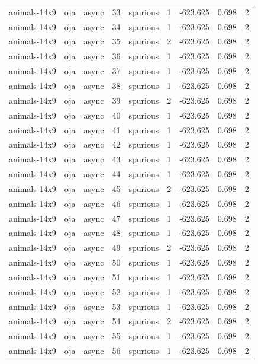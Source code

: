 \begin{tabular}{lllrlrrrr}
animals-14x9 & oja & async & 33 & spurious & 1 & -623.625 & 0.698 & 2 \\
animals-14x9 & oja & async & 34 & spurious & 1 & -623.625 & 0.698 & 2 \\
animals-14x9 & oja & async & 35 & spurious & 2 & -623.625 & 0.698 & 2 \\
animals-14x9 & oja & async & 36 & spurious & 1 & -623.625 & 0.698 & 2 \\
animals-14x9 & oja & async & 37 & spurious & 1 & -623.625 & 0.698 & 2 \\
animals-14x9 & oja & async & 38 & spurious & 1 & -623.625 & 0.698 & 2 \\
animals-14x9 & oja & async & 39 & spurious & 2 & -623.625 & 0.698 & 2 \\
animals-14x9 & oja & async & 40 & spurious & 1 & -623.625 & 0.698 & 2 \\
animals-14x9 & oja & async & 41 & spurious & 1 & -623.625 & 0.698 & 2 \\
animals-14x9 & oja & async & 42 & spurious & 1 & -623.625 & 0.698 & 2 \\
animals-14x9 & oja & async & 43 & spurious & 1 & -623.625 & 0.698 & 2 \\
animals-14x9 & oja & async & 44 & spurious & 1 & -623.625 & 0.698 & 2 \\
animals-14x9 & oja & async & 45 & spurious & 2 & -623.625 & 0.698 & 2 \\
animals-14x9 & oja & async & 46 & spurious & 1 & -623.625 & 0.698 & 2 \\
animals-14x9 & oja & async & 47 & spurious & 1 & -623.625 & 0.698 & 2 \\
animals-14x9 & oja & async & 48 & spurious & 1 & -623.625 & 0.698 & 2 \\
animals-14x9 & oja & async & 49 & spurious & 2 & -623.625 & 0.698 & 2 \\
animals-14x9 & oja & async & 50 & spurious & 1 & -623.625 & 0.698 & 2 \\
animals-14x9 & oja & async & 51 & spurious & 1 & -623.625 & 0.698 & 2 \\
animals-14x9 & oja & async & 52 & spurious & 1 & -623.625 & 0.698 & 2 \\
animals-14x9 & oja & async & 53 & spurious & 1 & -623.625 & 0.698 & 2 \\
animals-14x9 & oja & async & 54 & spurious & 2 & -623.625 & 0.698 & 2 \\
animals-14x9 & oja & async & 55 & spurious & 1 & -623.625 & 0.698 & 2 \\
animals-14x9 & oja & async & 56 & spurious & 1 & -623.625 & 0.698 & 2 \\

\end{tabular}
